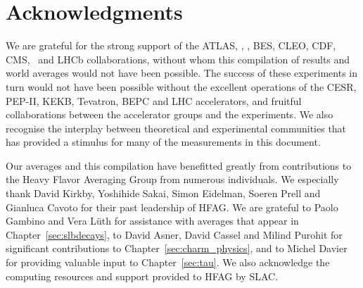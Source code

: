 \section{Acknowledgments}

We are grateful for the strong support of the 
ATLAS, \babar, \belle, BES, CLEO, CDF, CMS, \dzero\ and LHCb collaborations,
without whom this compilation of results and world averages would not have  
been possible. The success of these experiments in turn would 
not have been possible without the excellent operations of the 
CESR, PEP-II, KEKB, Tevatron, BEPC and LHC accelerators, and fruitful 
collaborations between the accelerator groups and the experiments.
We also recognise the interplay between theoretical and experimental
communities that has provided a stimulus for many of the measurements in this
document.

Our averages and this compilation have benefitted greatly from 
contributions to the Heavy Flavor Averaging Group from numerous
individuals. We especially thank David Kirkby, Yoshihide Sakai, 
Simon Eidelman, Soeren Prell and Gianluca Cavoto for their
past leadership of HFAG. 
We are grateful to Paolo Gambino and Vera L\"{u}th for assistance with
averages that appear in Chapter~\ref{sec:slbdecays},
to David Asner, David Cassel and Milind Purohit 
for significant contributions to Chapter~\ref{sec:charm_physics}, 
and to Michel Davier for providing valuable input to Chapter~\ref{sec:tau}.
We also acknowledge the computing resources and support provided to HFAG by
SLAC.
